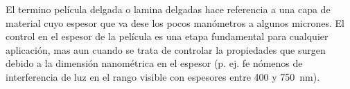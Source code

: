 



				

	El termino película delgada o lamina delgadas hace referencia a una capa de material cuyo espesor que va dese los pocos manómetros a algunos micrones. El control en el espesor de la película es una etapa fundamental para cualquier aplicación, mas aun cuando se trata de controlar la propiedades que surgen debido a la dimensión nanométrica en el espesor (p. ej. fe nómenos de interferencia de luz en el rango visible con espesores entre 400 y \SI{750}{\nm}). 

